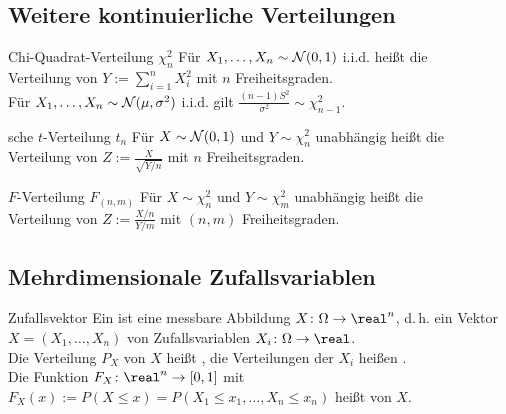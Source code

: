 \subsection{%
    Weitere kontinuierliche Verteilungen%
}

\begin{Def}{Chi-Quadrat-Verteilung $\chi_n^2$}
    Für $X_1, \dotsc, X_n \sim \mathcal{N}(0, 1)$ i.i.d. heißt die\\
    Verteilung von
    $Y := \sum_{i=1}^n X_i^2$ 
    mit $n$ Freiheitsgraden.\\
    Für $X_1, \dotsc, X_n \sim \mathcal{N}(\mu, \sigma^2)$ i.i.d. gilt
    $\frac{(n-1)S^2}{\sigma^2} \sim \chi_{n-1}^2$.
\end{Def}

\begin{Def}{sche $t$-Verteilung $t_n$}
    Für $X \sim \mathcal{N}(0, 1)$ und $Y \sim \chi_n^2$ unabhängig heißt die\\
    Verteilung von
    $Z := \frac{X}{\sqrt{Y/n}}$ 
    mit $n$ Freiheitsgraden.
\end{Def}

\begin{Def}{$F$-Verteilung $F_{(n,m)}$}
    Für $X \sim \chi_n^2$ und $Y \sim \chi_m^2$ unabhängig heißt die\\
    Verteilung von
    $Z := \frac{X/n}{Y/m}$ 
    mit $(n, m)$ Freiheitsgraden.
\end{Def}

\subsection{%
    Mehrdimensionale Zufallsvariablen%
}

\begin{Def}{Zufallsvektor}
    Ein  ist eine messbare Abbildung
    $X\colon \Omega \rightarrow \real^n$, d.\,h. ein Vektor $X = (X_1, \dotsc, X_n)$ von
    Zufallsvariablen $X_i\colon \Omega \rightarrow \real$.\\
    Die Verteilung $P_X$ von $X$ heißt ,
    die Verteilungen der $X_i$ heißen .\\
    Die Funktion $F_X\colon \real^n \rightarrow [0, 1]$ mit
    $F_X(x) := P(X \le x) = P(X_1 \le x_1, \dotsc, X_n \le x_n)$ heißt
     von $X$.
\end{Def}

